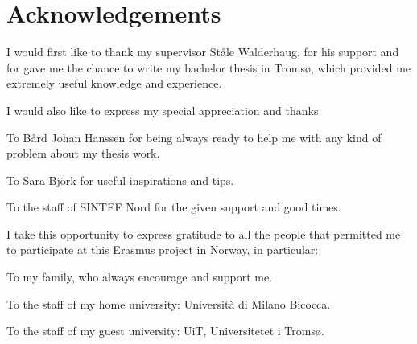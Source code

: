 \clearpage 
\chapter{Acknowledgements}

I would first like to thank my supervisor Ståle Walderhaug, for his support and for gave me the chance to write my bachelor thesis in Tromsø, which provided me extremely useful knowledge and experience.

\vspace{+0.5cm}

I would also like to express my special appreciation and thanks 

\hspace{1cm} To Bård Johan Hanssen for being always ready to help me with any kind of \hspace{1cm}problem about my thesis work.

\hspace{1cm} To Sara Björk for useful inspirations and tips. 

\hspace{1cm}  To the staff of SINTEF Nord for the given support and good times. 

\vspace{+0.5cm}
 
I take this opportunity to express gratitude to all the people that permitted me to participate at this Erasmus project in Norway, in particular:

\hspace{1cm} To my family, who always encourage and support me.

\hspace{1cm}  To the staff of my home university: Università di Milano Bicocca.

\hspace{1cm}  To the staff of my guest university: UiT, Universitetet i Tromsø.

 	 
 	 
 	 


